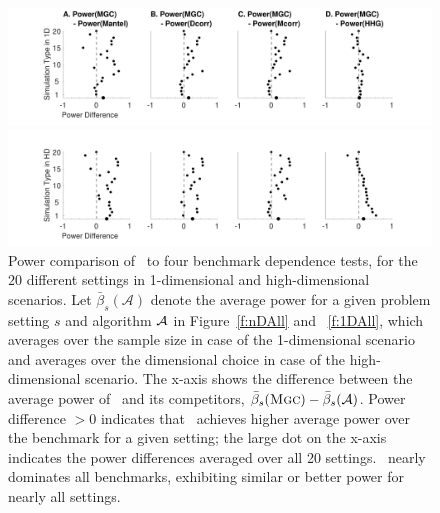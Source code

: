 \documentclass[11pt]{article}
\begin{document}
\begin{figure}
  \centering
  \includegraphics[width=1.0\textwidth,trim={3.0cm 0 3.5cm 0cm},clip]{Figures/Fig1DPowerMGCM}

  \includegraphics[width=1.0\textwidth,trim={3.0cm 0 3.5cm 0},clip]{Figures/FigHDPowerMGCM}
  \caption{Power comparison of  \Mgc~to four benchmark dependence tests, for the $20$ different settings in 1-dimensional and high-dimensional scenarios. Let $\bar{\beta}_s(\mathcal{A})$ denote the average power for a given problem setting $s$ and algorithm $\mathcal{A}$ in Figure~\ref{f:nDAll} and ~\ref{f:1DAll}, which averages over the sample size in case of the 1-dimensional scenario and averages over the dimensional choice in case of the high-dimensional scenario. The x-axis shows the difference between the average power of \Mgc~and its competitors,  $\bar{\beta}_s({\normalfont\textsc{Mgc}})-\bar{\beta}_s(\mathcal{A})$. Power difference $>0$ indicates that \Mgc~achieves higher average power over the benchmark for a given setting;
the large dot on the x-axis indicates the  power differences averaged over all 20 settings.
\Mgc~nearly dominates all benchmarks, exhibiting similar or better power for nearly all settings. }
\label{f:1DSummary}
\end{figure}
\end{document}
